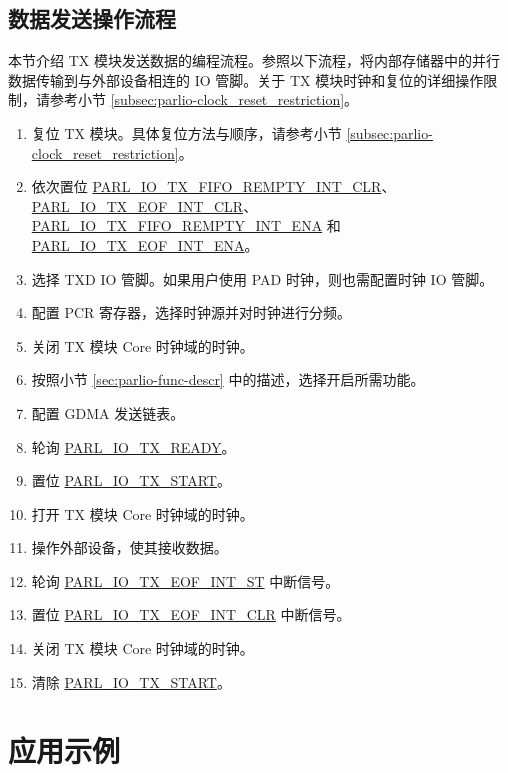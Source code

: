 \documentclass[main\_\_CN.tex]{subfiles}
\begin{document}
\subsection{数据发送操作流程}

本节介绍 TX 模块发送数据的编程流程。参照以下流程，将内部存储器中的并行数据传输到与外部设备相连的 IO 管脚。关于 TX 模块时钟和复位的详细操作限制，请参考小节 \ref{subsec:parlio-clock_reset_restriction}。

\begin{enumerate}
    \item 复位 TX 模块。具体复位方法与顺序，请参考小节 \ref{subsec:parlio-clock_reset_restriction}。
    \item 依次置位 \hyperref[fielddesc:PARLIOTXFIFOREMPTYINTCLR]{PARL\_IO\_TX\_FIFO\_REMPTY\_INT\_CLR}、\hyperref[fielddesc:PARLIOTXEOFINTCLR]{PARL\_IO\_TX\_EOF\_INT\_CLR}、\hyperref[fielddesc:PARLIOTXFIFOREMPTYINTENA]{PARL\_IO\_TX\_FIFO\_REMPTY\_INT\_ENA} 和 \hyperref[fielddesc:PARLIOTXEOFINTENA]{PARL\_IO\_TX\_EOF\_INT\_ENA}。
    \item 选择 TXD IO 管脚。如果用户使用 PAD 时钟，则也需配置时钟 IO 管脚。
    \item 配置 PCR 寄存器，选择时钟源并对时钟进行分频。
    \item 关闭 TX 模块 Core 时钟域的时钟。
    \item 按照小节 \ref{sec:parlio-func-descr} 中的描述，选择开启所需功能。
    \item 配置 GDMA 发送链表。
    \item 轮询 \hyperref[fielddesc:PARLIOTXREADY]{PARL\_IO\_TX\_READY}。
    \item 置位 \hyperref[fielddesc:PARLIOTXSTART]{PARL\_IO\_TX\_START}。
    \item 打开 TX 模块 Core 时钟域的时钟。
    \item 操作外部设备，使其接收数据。
    \item 轮询 \hyperref[fielddesc:PARLIOTXEOFINTST]{PARL\_IO\_TX\_EOF\_INT\_ST} 中断信号。
    \item 置位 \hyperref[fielddesc:PARLIOTXEOFINTCLR]{PARL\_IO\_TX\_EOF\_INT\_CLR} 中断信号。
    \item 关闭 TX 模块 Core 时钟域的时钟。
    \item 清除 \hyperref[fielddesc:PARLIOTXSTART]{PARL\_IO\_TX\_START}。
\end{enumerate}


\section{应用示例}
\label{sec:parlio-application-example}
\end{document}
